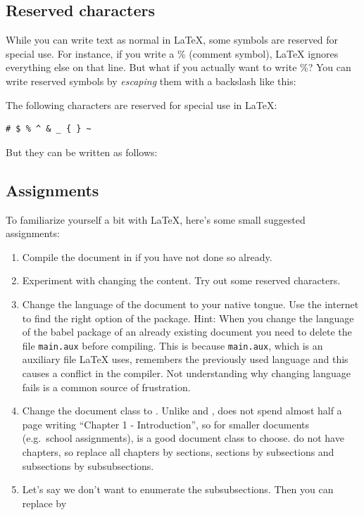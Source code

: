 \subsection{Reserved characters}
While you can write text as normal in \LaTeX{}, some symbols are reserved for special use. For instance, if you write a \% (comment symbol), \LaTeX{} ignores everything else on that line. But what if you actually want to write \%? You can write reserved symbols by \emph{escaping} them with a backslash like this:

The following characters are reserved for special use in \LaTeX{}:
\begin{verbatim}
# $ % ^ & _ { } ~
\end{verbatim} 

But they can be written as follows:

\latexone{\# \$ \% \^{} \& \_ \{ \} \~{} \textbackslash{}}


\subsection{Assignments}
To familiarize yourself a bit with \LaTeX{}, here's some small suggested assignments:
\begin{enumerate}
	\item Compile the document in  if you have not done so already.
	\item Experiment with changing the content. Try out some reserved characters.
	\item Change the language of the document to your native tongue. Use the internet to find the right option of the  package. Hint: When you change the language of the babel package of an already existing document you need to delete the file \verb|main.aux| before compiling. This is because \verb|main.aux|, which is an auxiliary file \LaTeX{} uses, remembers the previously used language and this causes a conflict in the compiler. Not understanding why changing language fails is a common source of frustration.
	\item Change the document class to . Unlike  and ,  does not spend almost half a page writing ``Chapter 1 - Introduction'', so for smaller documents (e.g.\ school assignments),  is a good document class to choose.  do not have chapters, so replace all chapters by sections, sections by subsections and subsections by subsubsections.
	\item Let's say we don't want to enumerate the subsubsections. Then you can replace  by 
\end{enumerate}

